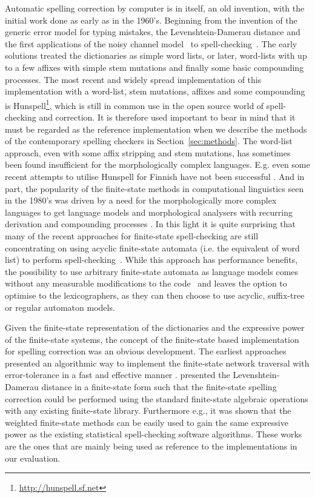 \documentclass[a4paper,12pt]{article}
\begin{document}
Automatic spelling correction by computer is in itself, an old invention, with
the initial work done as early as in the 1960's. Beginning from the invention
of the generic error model for typing mistakes, the Levenshtein-Damerau
distance \cite[]{levenshtein/1966,damerau/1964} and the first applications of
the noisy channel model~\cite[]{shannon/1948} to
spell-checking~\cite[]{raviv/1967}. The early solutions treated the
dictionaries as simple word lists, or later, word-lists with up to a few
affixes with simple stem mutations and finally some basic compounding
processes. The most recent and widely spread implementation of this
implementation with a word-list, stem mutations, affixes and some compounding
is Hunspell\footnote{\url{http://hunspell.sf.net}}, which is still in common
use in the open source world of spell-checking and correction. It is therefore
used important to bear in mind that it must be regarded as the reference
implementation when we describe the methods of the contemporary spelling
checkers in Section~\ref{sec:methods}. The word-list approach, even with some
affix stripping and stem mutations, has sometimes been found insufficient for
the morphologically complex languages. E.g. even some recent attempts to
utilise Hunspell for Finnish have not been successful \cite[]{pitkanen/2006}.
And in part, the popularity of the finite-state methods in computational
linguistics seen in the 1980's was driven by a need for the morphologically
more complex languages to get language models and morphological analysers with
recurring derivation and compounding processes
\cite[]{beesley2004morphological}. In this light it is quite surprising that
many of the recent approaches for finite-state spell-checking are still
concentrating on using acyclic finite-state automata (i.e. the equivalent of
word list) to perform
spell-checking~\cite[]{watson2003new,deorowicz2005correcting}. While this
approach has performance benefits, the possibility to use arbitrary
finite-state automata as language models comes without any measurable
modifications to the code~\cite[e.g.][]{pirinen/2010/lrec} and leaves the
option to optimise to the lexicographers, as they can then choose to use
acyclic, suffix-tree or regular automaton models.

Given the finite-state representation of the dictionaries and the expressive
power of the finite-state systems, the concept of the finite-state based
implementation for spelling correction was an obvious development. The earliest
approaches presented an algorithmic way to implement the finite-state network
traversal with error-tolerance \cite[]{oflazer/1996} in a fast and effective
manner \cite[]{agata/2002,hulden/2009}. \cite{schulz/2002} presented the
Levenshtein-Damerau distance in a finite-state form such that the
finite-state spelling correction could be performed using the standard
finite-state algebraic operations with any existing finite-state library.
Furthermore e.g., \cite{pirinen/2010/lrec} it was shown that the
weighted finite-state methods can be easily used to gain the same expressive
power as the existing statistical spell-checking software algorithms. These
works are the ones that are mainly being used as reference to the
implementations in our evaluation.
\end{document}
